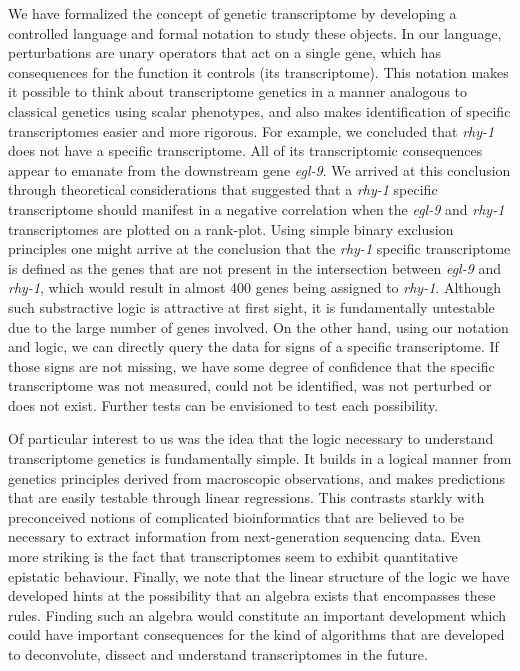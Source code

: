 \documentclass[9pt,twocolumn,twoside]{pnas-new}
\newcommand{\egl}{\emph{egl-9}}
\newcommand{\rhy}{\emph{rhy-1}}
\begin{document}
We have formalized the concept of genetic transcriptome by developing a controlled
language and formal notation to study these objects. In our language, perturbations
are unary operators that act on a single gene, which has consequences for the
function it controls (its transcriptome). This notation makes it possible to think
about transcriptome genetics in a manner analogous to classical genetics using
scalar phenotypes, and also makes identification of specific transcriptomes
easier and more rigorous. For example, we concluded that \rhy{} does not have a
specific transcriptome. All of its transcriptomic consequences appear to emanate
from the downstream gene \egl{}.
We arrived at this conclusion through theoretical considerations that suggested
that a \rhy{} specific transcriptome should manifest in a negative correlation
when the \egl{} and \rhy{} transcriptomes are plotted on a rank-plot. Using
simple binary exclusion principles one might arrive at the conclusion that the
\rhy{} specific transcriptome is defined as the genes that are not present in
the intersection between \egl{} and \rhy{}, which would result in almost 400
genes being assigned to \rhy{}. Although such substractive logic is attractive
at first sight, it is fundamentally untestable due to the large number of genes
involved.
On the other hand, using our notation and logic, we can directly query the data
for signs of a specific transcriptome. If those signs are not missing, we have
some degree of confidence that the specific transcriptome was not measured,
could not be identified, was not perturbed or does not exist. Further tests can
be envisioned to test each possibility.

Of particular interest to us was the idea that the logic necessary to understand
transcriptome genetics is fundamentally simple. It builds in a logical manner
from genetics principles derived from macroscopic observations, and makes
predictions that are easily testable through linear regressions. This contrasts
starkly with preconceived notions of complicated bioinformatics that are believed
to be necessary to extract information from next-generation sequencing data.
Even more striking is the fact that transcriptomes seem to exhibit quantitative
epistatic behaviour. Finally, we note that the linear structure of the logic we
have developed hints at the possibility that an algebra exists that encompasses
these rules. Finding such an algebra would constitute an important development
which could have important consequences for the kind of algorithms that are
developed to deconvolute, dissect and understand transcriptomes in the future.
\end{document}

